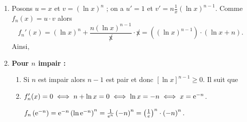 \begin{description}
\begin{description}
\begin{enumerate}
\[\begin{array}{r}
									\end{array}
								\right\rbrace
								\Rightarrow
								\lim_{x\rightarrow +\infty} x (\ln x)^n = +\infty	
							\]
								Ainsi,
								\par\noindent{}
						\item {}
							Posons $u = x$ et $v = (\ln x)^n$ ; on a $u' = 1$ et $v' = n \frac{1}{x} (\ln x)^{n-1}$.
							Comme $f_{n} (x) = u \cdot v$ alors 
							\[
								f_n ' (x)	= (\ln x)^n + \frac{n (\ln x)^{n-1}}{\not x} \cdot \not x			
											= \left( (\ln x)^{n-1} \right) \cdot \left( \ln x + n \right)		.
							\]
								Ainsi,
								\par\noindent{}
						\item \textbf{Pour $n$ impair :} 
							\begin{enumerate}
								\item {}
									Si $n$ est impair alors $n-1$ est pair et donc $\left[ \ln x \right]^{n-1} \geq 0$.
									Il suit que
									\par\noindent{}
								\item {}
											$f'_n(x) = 0 \iff n + \ln x = 0 \iff \ln x = -n \iff x = \mathrm{e}^{-n}$.
											\begin{figure}[h!]
											\centering
											\end{figure}
											$
											f_n \left( \mathrm{e}^{-n} \right)	= \mathrm{e}^{-n} \left( \ln \mathrm{e}^{-n} \right)^n
																					= \frac{1}{\mathrm{e}^{n}} \left( -n \right)^n
																					= \left(\frac{1}{e}\right)^n \cdot \left( -n \right)^n .
											$

\end{enumerate}
\end{enumerate}
\end{description}
\end{description}
